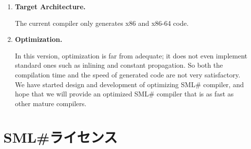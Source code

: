 \documentclass{jbook}
\newcommand{\txt}[2]{#1}
\newcommand{\smlsharp}{SML\#}
\begin{document}
\begin{enumerate}
\item {\bf Target Architecture.}

	The current compiler only generates x86 and x86-64 code.

\item {\bf Optimization.}

	In this version, optimization is far from adequate; it does not
even implement standard ones such as inlining and constant propagation.
	So both the compilation time and the speed of generated code are
not very satisfactory.
	We have started design and development of optimizing \smlsharp{}
compiler, and hope that we will provide an optimized \smlsharp{}
compiler that is as fast as other mature compilers.

%

%

%

\end{enumerate}
\fi%

\chapter{\txt{\smlsharp{}ライセンス}{\smlsharp{} License}}
\label{sec:smlsharpLicence}
\end{document}
